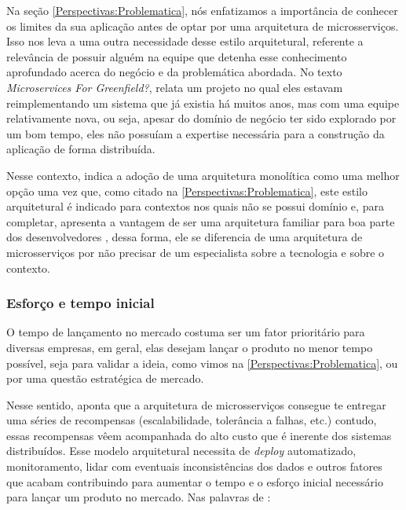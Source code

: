 Na seção \autoref{Perspectivas:Problematica}, nós enfatizamos a importância de conhecer os limites da
sua aplicação antes de optar por uma arquitetura de microsserviços. Isso nos leva a uma outra necessidade desse
estilo arquitetural, referente a relevância de possuir alguém na equipe que detenha esse conhecimento
aprofundado acerca do negócio e da problemática abordada. No texto \textit{Microservices For
Greenfield?},  relata um projeto no qual eles estavam reimplementando
um sistema que já existia há muitos anos, mas com uma equipe relativamente nova, ou seja, apesar do
domínio de negócio ter sido explorado por um bom tempo, eles não possuíam a expertise necessária
para a construção da aplicação de forma distribuída.

Nesse contexto,  indica a adoção de uma arquitetura monolítica como uma
melhor opção uma vez que, como citado na \autoref{Perspectivas:Problematica}, este estilo arquitetural
é indicado para contextos nos quais não se possui domínio e, para completar, apresenta a vantagem de ser uma
arquitetura familiar para boa parte dos desenvolvedores
\cite{Richards2020:FundamentalsOfSoftwareArchitecture}, dessa forma, ele se diferencia de uma
arquitetura de microsserviços por não precisar de um especialista sobre a tecnologia e sobre o contexto.


\subsubsection{Esforço e tempo inicial}
\label{effortsAndTime}

O tempo de lançamento no mercado costuma ser um fator prioritário para diversas empresas, em geral,
elas desejam lançar o produto no menor tempo possível, seja para validar a ideia, como
vimos na \autoref{Perspectivas:Problematica}, ou por uma questão estratégica de mercado.

Nesse sentido,  aponta que a arquitetura de
microsserviços consegue te entregar uma séries de recompensas (escalabilidade, tolerância a falhas,
etc.) contudo, essas recompensas vêem acompanhada do alto custo que é inerente dos sistemas distribuídos.
Esse modelo arquitetural necessita de \textit{deploy} automatizado, monitoramento, lidar com
eventuais inconsistências dos dados e outros fatores que acabam contribuindo para aumentar o tempo e o esforço
inicial necessário para lançar um produto no mercado. Nas palavras de
:

